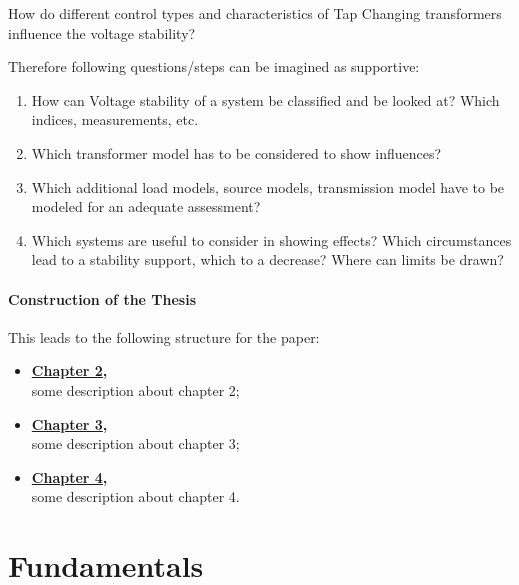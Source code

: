 \begin{tcolorbox}[float, colback=ees_blue!5!white,colframe=ees_blue!75!black, toptitle=1mm, bottomtitle=1mm, left=2mm, right=2.5mm, top=2mm, bottom=2mm, title={\textbf{Research question of this thesis}}]
    How do different control types and characteristics of Tap Changing transformers influence the voltage stability?
\end{tcolorbox}

Therefore following questions/steps can be imagined as supportive:
\begin{enumerate}
    \item How can Voltage stability of a system be classified and be looked at? Which indices, measurements, etc.
    \item Which transformer model has to be considered to show influences?
    \item Which additional load models, source models, transmission model have to be modeled for an adequate assessment?
    \item Which systems are useful to consider in showing effects? Which circumstances lead to a stability support, which to a decrease? Where can limits be drawn?
\end{enumerate}

\subsubsection{Construction of the Thesis}

This leads to the following structure for the paper: 
\begin{itemize}
    \item \textbf{\hyperref[chap:fundamentals]{Chapter 2},}\\
    some description about chapter 2;
    \item \textbf{\hyperref[chap:methods]{Chapter 3},}\\
    some description about chapter 3;
    \item \textbf{\hyperref[chap:results]{Chapter 4},}\\
    some description about chapter 4.
\end{itemize}

\chapter{Fundamentals}
\label{ch:fundamentals}

